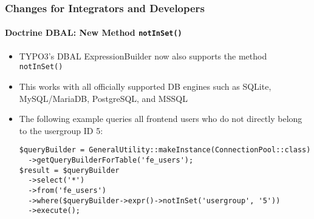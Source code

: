 %

\begin{frame}[fragile]
	\frametitle{Changes for Integrators and Developers}
	\framesubtitle{Doctrine DBAL: New Method \texttt{notInSet()}}


	\begin{itemize}
		\item TYPO3's DBAL ExpressionBuilder now also supports the method \texttt{notInSet()}
		\item This works with all officially supported DB engines such as SQLite,
			MySQL/MariaDB, PostgreSQL, and MSSQL
		\item The following example queries all frontend users who do not directly
			belong to the usergroup ID 5:
\begin{lstlisting}
$queryBuilder = GeneralUtility::makeInstance(ConnectionPool::class)
  ->getQueryBuilderForTable('fe_users');
$result = $queryBuilder
  ->select('*')
  ->from('fe_users')
  ->where($queryBuilder->expr()->notInSet('usergroup', '5'))
  ->execute();
\end{lstlisting}

	\end{itemize}

\end{frame}

